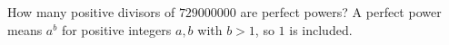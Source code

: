 How many positive divisors of $729000000$ are perfect powers? A perfect power means $a^b$ for positive integers $a,b$ with $b>1$, so $1$ is included.
